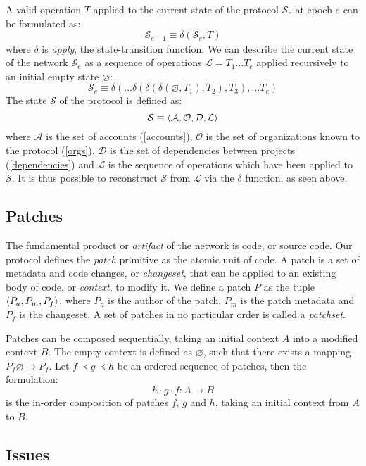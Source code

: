 A valid operation $T$ applied to the current state of
the protocol $\mathcal{S}_e$ at epoch $e$ can be formulated as:
\[
    \mathcal{S}_{e+1} \equiv \delta(\mathcal{S}_e, T)
\]
where $\delta$ is \emph{apply}, the state-transition function.  We can describe
the current state of the network $\mathcal{S}_e$ as a sequence of operations
$\mathcal{L} = T_1 \dots T_e$ applied recursively to an initial empty state
$\varnothing$:
\[
    \mathcal{S}_e \equiv \delta(\dots \delta(\delta(\delta(\varnothing,
    T_1), T_2), T_3), \dots T_e)
\]
The state $\mathcal{S}$ of the protocol is defined as:
\[
    \mathcal{S} \equiv \langle \mathcal{A}, \mathcal{O}, \mathcal{D}, \mathcal{L} \rangle \\
\]
where $\mathcal{A}$ is the set of accounts (\ref{accounts}), $\mathcal{O}$ is
the set of organizations known to the protocol (\ref{orgs}), $\mathcal{D}$ is
the set of dependencies between projects (\ref{dependencies}) and $\mathcal{L}$
is the sequence of operations which have been applied to $\mathcal{S}$. It is
thus possible to reconstruct $\mathcal{S}$ from $\mathcal{L}$ via the $\delta$
function, as seen above.

\subsection{Patches}
\label{patches}

The fundamental product or \emph{artifact} of the \oscoin{} network is code, or
source code. Our protocol defines the \emph{patch} primitive as the atomic unit
of code. A patch is a set of metadata and code changes, or \emph{changeset},
that can be applied to an existing body of code, or \emph{context}, to modify
it. We define a patch $P$ as the tuple $\langle  P_a, P_m, P_f \rangle$, where $P_a$ is
the author of the patch, $P_m$ is the patch metadata and $P_f$ is the
changeset. A set of patches in no particular order is called a \emph{patchset}.

Patches can be composed sequentially, taking an initial context $A$ into
a modified context $B$. The empty context is defined as $\varnothing$, such
that there exists a mapping $P_f \varnothing \mapsto P_f$. Let $f \prec g
\prec h$ be an ordered sequence of patches, then the formulation:
\[
h \cdot g \cdot f : A \to B
\]
is the in-order composition of patches $f$, $g$ and $h$, taking an initial
context from $A$ to $B$.


\subsection{Issues}
\label{issues}

